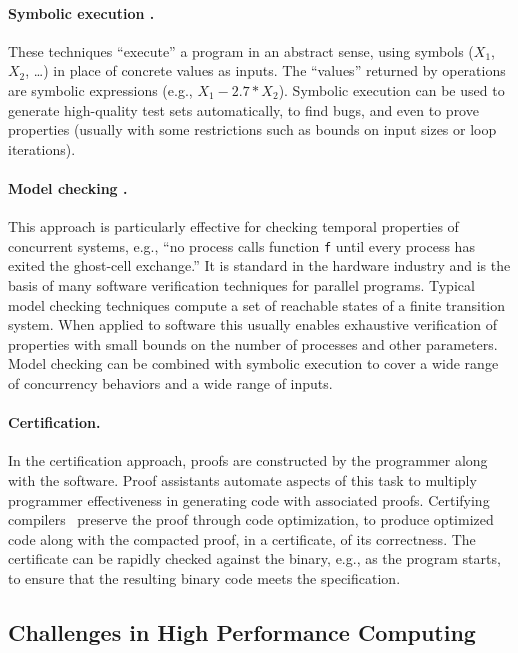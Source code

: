 \paragraph{Symbolic execution \cite{king:1976:symbolic, klee:osdi:2008, siegel-zirkel:2011:tass-mcs}.}  These techniques ``execute'' a program in an abstract sense, using symbols ($X_1$, $X_2$, \ldots) in place of concrete values as inputs.  The ``values'' returned by operations are symbolic expressions (e.g., $X_1-2.7*X_2$).  Symbolic execution can be used to generate high-quality test sets automatically, to find bugs, and even to prove properties (usually with some restrictions such as bounds on input sizes or loop iterations).

\paragraph{Model checking \cite{clarke-grumberg-peled:1999:book}.}  This approach is particularly effective for checking temporal properties of concurrent systems, e.g., ``no process calls function \texttt{f} until every process has exited the ghost-cell exchange.''  It is standard in the hardware industry and is the basis of many software verification techniques for parallel programs.  Typical model checking techniques compute a set of reachable states of a finite transition system.  When applied to software this usually enables exhaustive verification of properties with small bounds on the number of processes and other parameters. Model checking can be combined with symbolic execution to cover a wide range of concurrency behaviors and a wide range of inputs.

\paragraph{Certification.}
In the certification approach, proofs are constructed by the programmer along with the software.  Proof assistants automate aspects of this task to multiply programmer effectiveness in generating code with associated proofs.  Certifying compilers~\cite{leroy2009formal} preserve the proof through code optimization, to produce optimized code along with the compacted proof, in a certificate, of its correctness.  The certificate can be rapidly checked against the binary, e.g., as the program starts, to ensure that the resulting binary code meets the specification. 

\subsection{Challenges in High Performance Computing}
\label{sec:correctness_hpc}

